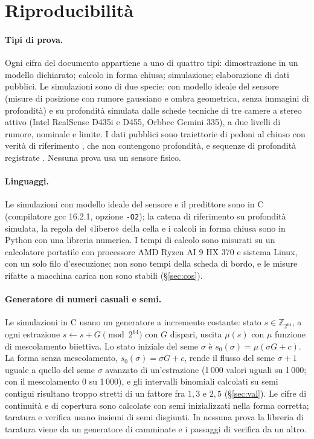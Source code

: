 \section{Riproducibilità}\label{sec:rip}

\paragraph{Tipi di prova.} Ogni cifra del documento appartiene a uno di quattro tipi: dimostrazione in un modello dichiarato; calcolo in forma chiusa; simulazione; elaborazione di dati pubblici. Le simulazioni sono di due specie: con modello ideale del sensore (misure di posizione con rumore gaussiano e ombra geometrica, senza immagini di profondità) e su profondità simulata dalle schede tecniche di tre camere a stereo attivo (Intel RealSense D435i e D455, Orbbec Gemini 335), a due livelli di rumore, nominale e limite. I dati pubblici sono traiettorie di pedoni al chiuso con verità di riferimento \cite{thor}, che non contengono profondità, e sequenze di profondità registrate \cite{tum-rgbd,depthtrack}. Nessuna prova usa un sensore fisico.

\paragraph{Linguaggi.} Le simulazioni con modello ideale del sensore e il predittore sono in C (compilatore gcc 16.2.1, opzione \texttt{-O2}); la catena di riferimento su profondità simulata, la regola del «libero» della cella e i calcoli in forma chiusa sono in Python con una libreria numerica. I tempi di calcolo sono misurati su un calcolatore portatile con processore AMD Ryzen AI 9 HX 370 e sistema Linux, con un solo filo d'esecuzione; non sono tempi della scheda di bordo, e le misure rifatte a macchina carica non sono stabili (\S\ref{sec:cos}).

\paragraph{Generatore di numeri casuali e semi.} Le simulazioni in C usano un generatore a incremento costante: stato $s\in\mathbb{Z}_{2^{64}}$, a ogni estrazione $s\leftarrow s+G \pmod{2^{64}}$ con $G$ dispari, uscita $\mu(s)$ con $\mu$ funzione di mescolamento biiettiva. Lo stato iniziale del seme $\sigma$ è $s_0(\sigma)=\mu(\sigma G+c)$. La forma senza mescolamento, $s_0(\sigma)=\sigma G+c$, rende il flusso del seme $\sigma+1$ uguale a quello del seme $\sigma$ avanzato di un'estrazione (1\,000 valori uguali su 1\,000; con il mescolamento 0 su 1\,000), e gli intervalli binomiali calcolati su semi contigui risultano troppo stretti di un fattore fra $1{,}3$ e $2{,}5$ (\S\ref{sec:val}). Le cifre di continuità e di copertura sono calcolate con semi inizializzati nella forma corretta; taratura e verifica usano insiemi di semi disgiunti. In nessuna prova la libreria di taratura viene da un generatore di camminate e i passaggi di verifica da un altro.

